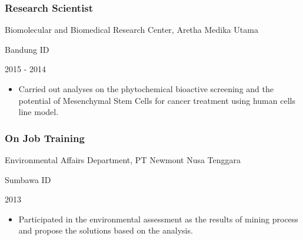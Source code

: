\documentclass[]{article}
\providecommand{\tightlist}{%
  \setlength{\itemsep}{0pt}\setlength{\parskip}{0pt}}
\begin{document}
\hypertarget{research-scientist}{%
\subsubsection{\texorpdfstring{\textbf{Research
Scientist}}{Research Scientist}}\label{research-scientist}}

Biomolecular and Biomedical Research Center, Aretha Medika Utama

Bandung ID

2015 - 2014

\begin{itemize}
\tightlist
\item
  Carried out analyses on the phytochemical bioactive screening and the
  potential of Mesenchymal Stem Cells for cancer treatment using human
  cells line model.
\end{itemize}

\hypertarget{on-job-training}{%
\subsubsection{\texorpdfstring{\textbf{On Job
Training}}{On Job Training}}\label{on-job-training}}

Environmental Affairs Department, PT Newmont Nusa Tenggara

Sumbawa ID

2013

\begin{itemize}
\tightlist
\item
  Participated in the environmental assessment as the results of mining
  process and propose the solutions based on the analysis.
\end{itemize}
\end{document}
